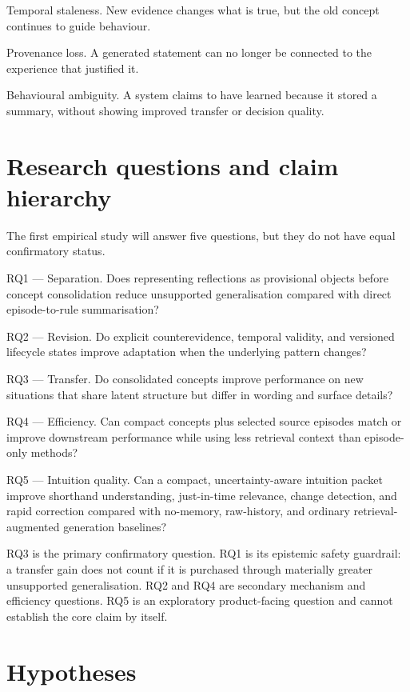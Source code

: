 \documentclass[
  english,
  a4paper,
  DIV=11,
  numbers=noendperiod]{scrreprt}
\begin{document}
Temporal staleness. New evidence changes what is true, but the old
concept continues to guide behaviour.

Provenance loss. A generated statement can no longer be connected to the
experience that justified it.

Behavioural ambiguity. A system claims to have learned because it stored
a summary, without showing improved transfer or decision quality.

\section{Research questions and claim
hierarchy}\label{research-questions-and-claim-hierarchy}

The first empirical study will answer five questions, but they do not
have equal confirmatory status.

RQ1 --- Separation. Does representing reflections as provisional objects
before concept consolidation reduce unsupported generalisation compared
with direct episode-to-rule summarisation?

RQ2 --- Revision. Do explicit counterevidence, temporal validity, and
versioned lifecycle states improve adaptation when the underlying
pattern changes?

RQ3 --- Transfer. Do consolidated concepts improve performance on new
situations that share latent structure but differ in wording and surface
details?

RQ4 --- Efficiency. Can compact concepts plus selected source episodes
match or improve downstream performance while using less retrieval
context than episode-only methods?

RQ5 --- Intuition quality. Can a compact, uncertainty-aware intuition
packet improve shorthand understanding, just-in-time relevance, change
detection, and rapid correction compared with no-memory, raw-history,
and ordinary retrieval-augmented generation baselines?

RQ3 is the primary confirmatory question. RQ1 is its epistemic safety
guardrail: a transfer gain does not count if it is purchased through
materially greater unsupported generalisation. RQ2 and RQ4 are secondary
mechanism and efficiency questions. RQ5 is an exploratory product-facing
question and cannot establish the core claim by itself.

\section{Hypotheses}\label{hypotheses}
\end{document}
